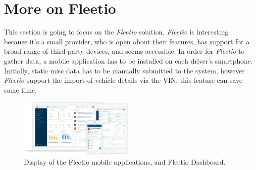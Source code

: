 \section{More on Fleetio}
This section is going to focus on the \textit{Fleetio} solution.
\textit{Fleetio} is interesting because it's a small provider, who is open about their features, has support for a broad range of third party devices, and seems accessible.
In order for \textit{Fleetio} to gather data, a mobile application has to be installed on each driver's smartphone.
Initially, static misc data has to be manually submitted to the system, however \textit{Fleetio} support the import of vehicle details via the \ac{VIN}, this feature can save some time.

\begin{figure}[h!]
    \centering
    \includegraphics[width=0.5\textwidth]{img/fleetio.png}
    \caption{Display of the Fleetio mobile applications, and Fleetio Dashboard.}
    \label{fig:Fleetio_Devices}
\end{figure}

